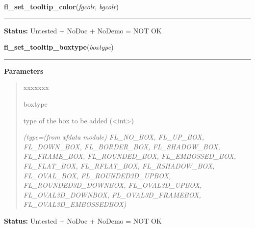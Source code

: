     \label{xformslib:library:fl_set_tooltip_color}

    \vspace{0.5ex}

\hspace{.8\funcindent}\begin{boxedminipage}{\funcwidth}

    \raggedright \textbf{fl\_set\_tooltip\_color}(\textit{fgcolr}, \textit{bgcolr})

    \vspace{-1.5ex}

    \rule{\textwidth}{0.5\fboxrule}
\setlength{\parskip}{2ex}
\setlength{\parskip}{1ex}
\textbf{Status:} Untested + NoDoc + NoDemo = NOT OK



    \end{boxedminipage}

    \label{xformslib:library:fl_set_tooltip_boxtype}

    \vspace{0.5ex}

\hspace{.8\funcindent}\begin{boxedminipage}{\funcwidth}

    \raggedright \textbf{fl\_set\_tooltip\_boxtype}(\textit{boxtype})

    \vspace{-1.5ex}

    \rule{\textwidth}{0.5\fboxrule}
\setlength{\parskip}{2ex}
\setlength{\parskip}{1ex}
      \textbf{Parameters}
      \vspace{-1ex}

      \begin{quote}
        \begin{Ventry}{xxxxxxx}

          \item[boxtype]

          type of the box to be added ({\textless}int{\textgreater})

            {\it (type=(from xfdata module) FL\_NO\_BOX, FL\_UP\_BOX, FL\_DOWN\_BOX, 
FL\_BORDER\_BOX, FL\_SHADOW\_BOX, FL\_FRAME\_BOX, FL\_ROUNDED\_BOX, 
FL\_EMBOSSED\_BOX, FL\_FLAT\_BOX, FL\_RFLAT\_BOX, FL\_RSHADOW\_BOX, 
FL\_OVAL\_BOX, FL\_ROUNDED3D\_UPBOX, FL\_ROUNDED3D\_DOWNBOX, 
FL\_OVAL3D\_UPBOX, FL\_OVAL3D\_DOWNBOX, FL\_OVAL3D\_FRAMEBOX, 
FL\_OVAL3D\_EMBOSSEDBOX)}

        \end{Ventry}

      \end{quote}

\textbf{Status:} Untested + NoDoc + NoDemo = NOT OK



    \end{boxedminipage}


